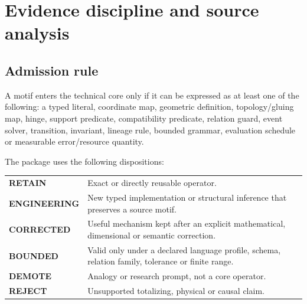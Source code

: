\documentclass[10pt,a4paper]{article}
\begin{document}
\section{Evidence discipline and source analysis}

\subsection{Admission rule}
A motif enters the technical core only if it can be expressed as at least one of the following: a typed literal, coordinate map, geometric definition, topology/gluing map, hinge, support predicate, compatibility predicate, relation guard, event solver, transition, invariant, lineage rule, bounded grammar, evaluation schedule or measurable error/resource quantity.

The package uses the following dispositions:

\begin{center}
\begin{tabularx}{0.95\textwidth}{>{\bfseries}p{2.5cm}X}
\toprule
RETAIN & Exact or directly reusable operator. \\
ENGINEERING & New typed implementation or structural inference that preserves a source motif. \\
CORRECTED & Useful mechanism kept after an explicit mathematical, dimensional or semantic correction. \\
BOUNDED & Valid only under a declared language profile, schema, relation family, tolerance or finite range. \\
DEMOTE & Analogy or research prompt, not a core operator. \\
REJECT & Unsupported totalizing, physical or causal claim. \\
\bottomrule
\end{tabularx}
\end{center}
\end{document}
